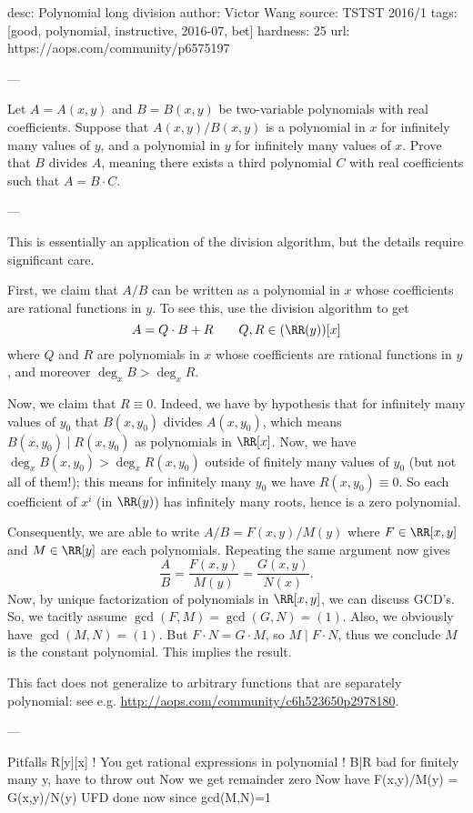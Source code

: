 desc:  Polynomial long division
author: Victor Wang
source:  TSTST 2016/1
tags:  [good, polynomial, instructive, 2016-07, bet]
hardness: 25
url: https://aops.com/community/p6575197

---

Let $A = A(x,y)$ and $B = B(x,y)$ be
two-variable polynomials with real coefficients.
Suppose that $A(x,y)/B(x,y)$ is a polynomial in $x$
for infinitely many values of $y$,
and a polynomial in $y$ for infinitely many values of $x$.
Prove that $B$ divides $A$, meaning there exists a third polynomial $C$
with real coefficients such that $A = B \cdot C$.

---

This is essentially an application of the division algorithm,
but the details require significant care.

First, we claim that $A/B$ can be written as a polynomial in $x$
whose coefficients are rational functions in $y$.
To see this, use the division algorithm to get
\[ A = Q \cdot B + R \qquad Q,R \in (\RR(y))[x] \]
where $Q$ and $R$ are polynomials in $x$
whose coefficients are rational functions in $y$,
and moreover $\deg_x B > \deg_x R$.

Now, we claim that $R \equiv 0$.
Indeed, we have by hypothesis that for infinitely many values of $y_0$
that $B(x,y_0)$ divides $A(x, y_0)$,
which means $B(x,y_0) \mid R(x,y_0)$ as polynomials in $\RR[x]$.
Now, we have $\deg_x B(x,y_0) > \deg_x R(x,y_0)$
outside of finitely many values of $y_0$ (but not all of them!);
this means for infinitely many $y_0$ we have $R(x,y_0) \equiv 0$.
So each coefficient of $x^i$ (in $\RR(y)$)
has infinitely many roots, hence is a zero polynomial.

Consequently, we are able to write $A / B = F(x,y) / M(y)$
where $F \in \RR[x,y]$ and $M \in \RR[y]$ are each polynomials.
Repeating the same argument now gives
\[ \frac AB = \frac{F(x,y)}{M(y)} = \frac{G(x,y)}{N(x)}. \]
Now, by unique factorization of polynomials in $\RR[x,y]$,
we can discuss GCD's.
So, we tacitly assume $\gcd(F,M) = \gcd(G,N) = (1)$.
Also, we obviously have $\gcd(M,N) = (1)$.
But $F \cdot N = G \cdot M$, so $M \mid F \cdot N$,
thus we conclude $M$ is the constant polynomial.
This implies the result.

\begin{remark*} This fact does not generalize to arbitrary functions that are separately polynomial:
see e.g. \url{http://aops.com/community/c6h523650p2978180}. \end{remark*}

---

Pitfalls
R[y][x]
! You get rational expressions in polynomial
! B|R bad for finitely many y, have to throw out
Now we get remainder zero
Now have F(x,y)/M(y) = G(x,y)/N(y)
UFD done now since gcd(M,N)=1
